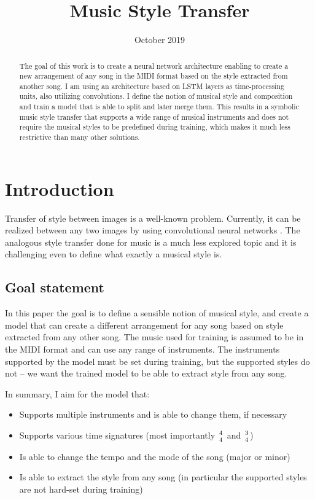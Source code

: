 \documentclass[en]{pracamgr}
\title{Music Style Transfer}
\date{October 2019}
\begin{document}
\maketitle

\begin{abstract}
    The goal of this work is to create a neural network architecture enabling to create a new arrangement of any song in the MIDI format based on the style extracted from another song.
    I am using an architecture based on LSTM layers as time-processing units, also utilizing convolutions.
    I define the notion of musical style and composition and train a model that is able to split and later merge them.
    This results in a symbolic music style transfer that supports a wide range of musical instruments and does not require the musical styles to be predefined during training, which makes it much less restrictive than many other solutions.
\end{abstract}

\tableofcontents
\listoffigures

\chapter{Introduction}

Transfer of style between images is a well-known problem.
Currently, it can be realized between any two images by using convolutional neural networks \cite{image_style_transfer}.
The analogous style transfer done for music is a much less explored topic and it is challenging even to define what exactly a musical style is.

\section{Goal statement}

In this paper the goal is to define a sensible notion of musical style, and create a model that can create a different arrangement for any song based on style extracted from any other song.
The music used for training is assumed to be in the MIDI format and can use any range of instruments.
The instruments supported by the model must be set during training, but the supported styles do not -- we want the trained model to be able to extract style from any song.

In summary, I aim for the model that:

\begin{itemize}
    \item Supports multiple instruments and is able to change them, if necessary
    \item Supports various time signatures (most importantly $4\atop4$ and $3\atop4$)
    \item Is able to change the tempo and the mode of the song (major or minor)
    \item Is able to extract the style from any song (in particular the supported styles are not hard-set during training)
\end{itemize}
\end{document}
